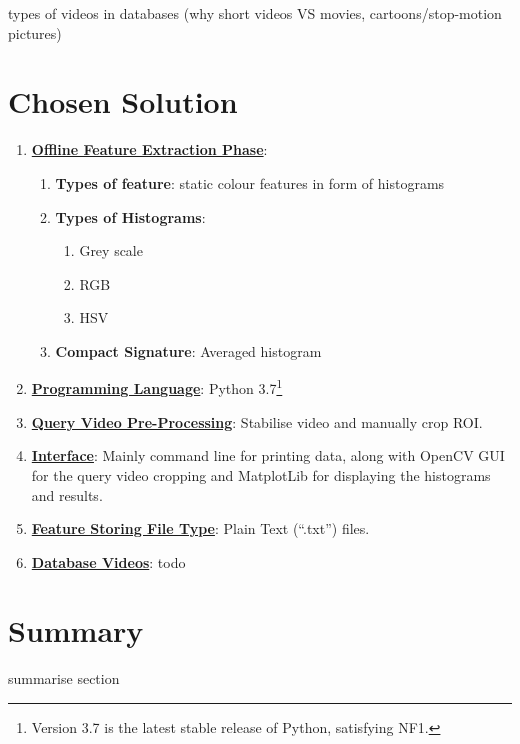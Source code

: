 types of videos in databases (why short videos VS movies, cartoons/stop-motion pictures)

\section{Chosen Solution}

\begin{enumerate}
    \item \underline{\textbf{Offline Feature Extraction Phase}}:
    \begin{enumerate}
        \item \textbf{Types of feature}: static colour features in form of histograms
        \item \textbf{Types of Histograms}:
        \begin{enumerate}
            \item Grey scale
            \item RGB
            \item HSV
        \end{enumerate}
        \item \textbf{Compact Signature}: Averaged histogram
    \end{enumerate}
    \item \underline{\textbf{Programming Language}}: Python 3.7\footnote{Version 3.7 is the latest stable release of Python, satisfying NF1.}
    \item \underline{\textbf{Query Video Pre-Processing}}: Stabilise video and manually crop ROI.
    \item \underline{\textbf{Interface}}: Mainly command line for printing data, along with OpenCV GUI for the query video cropping and MatplotLib for displaying the histograms and results.
    \item \underline{\textbf{Feature Storing File Type}}: Plain Text (``.txt'') files.
    \item \underline{\textbf{Database Videos}}: todo
\end{enumerate}

\section{Summary}

summarise section
